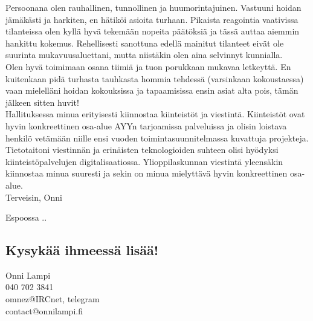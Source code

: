 \documentclass[a4paper, 12pt, finnish]{report}
\newcommand*{\findate}{\the\day.\the\month.\the\year}
\begin{document}
Persoonana olen rauhallinen, tunnollinen ja huumorintajuinen.
Vastuuni hoidan jämäkästi ja harkiten, en hätiköi asioita turhaan.
Pikaista reagointia vaativissa tilanteissa olen kyllä hyvä tekemään nopeita päätöksiä ja tässä auttaa aiemmin hankittu kokemus.
Rehellisesti sanottuna edellä mainitut tilanteet eivät ole suurinta mukavuusaluettani, mutta niistäkin olen aina selvinnyt kunnialla.\\

Olen hyvä toimimaan osana tiimiä ja tuon porukkaan mukavaa letkeyttä.
En kuitenkaan pidä turhasta tauhkasta hommia tehdessä (varsinkaan kokoustaessa) vaan mielelläni hoidan kokouksissa ja tapaamisissa ensin asiat alta pois, tämän jälkeen sitten huvit!\\

Hallituksessa minua erityisesti kiinnostaa kiinteistöt ja viestintä.
Kiinteistöt ovat hyvin konkreettinen osa-alue AYYn tarjoamissa palveluissa ja olisin loistava henkilö vetämään niille ensi vuoden toimintasuunnitelmassa kuvattuja projekteja.
Tietotaitoni viestinnän ja erinäisten teknologioiden suhteen olisi hyödyksi kiinteistöpalvelujen digitalisaatiossa.
Ylioppilaskunnan viestintä yleensäkin kiinnostaa minua suuresti ja sekin on minua mielyttävä hyvin konkreettinen osa-alue.\\

Terveisin, Onni

Espoossa \findate

\subsection*{Kysykää ihmeessä lisää!}
Onni Lampi\\
040 702 3841\\
omnez@IRCnet, telegram\\
contact@onnilampi.fi
\end{document}
